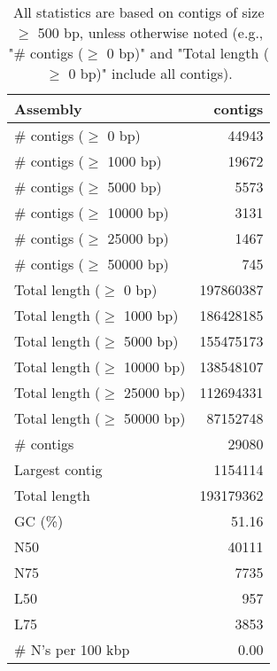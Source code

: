 \documentclass[12pt,a4paper]{article}
\begin{document}
\begin{table}[ht]
\begin{center}
\caption{All statistics are based on contigs of size $\geq$ 500 bp, unless otherwise noted (e.g., "\# contigs ($\geq$ 0 bp)" and "Total length ($\geq$ 0 bp)" include all contigs).}
\begin{tabular}{|l*{1}{|r}|}
\hline
Assembly & contigs \\ \hline
\# contigs ($\geq$ 0 bp) & 44943 \\ \hline
\# contigs ($\geq$ 1000 bp) & 19672 \\ \hline
\# contigs ($\geq$ 5000 bp) & 5573 \\ \hline
\# contigs ($\geq$ 10000 bp) & 3131 \\ \hline
\# contigs ($\geq$ 25000 bp) & 1467 \\ \hline
\# contigs ($\geq$ 50000 bp) & 745 \\ \hline
Total length ($\geq$ 0 bp) & 197860387 \\ \hline
Total length ($\geq$ 1000 bp) & 186428185 \\ \hline
Total length ($\geq$ 5000 bp) & 155475173 \\ \hline
Total length ($\geq$ 10000 bp) & 138548107 \\ \hline
Total length ($\geq$ 25000 bp) & 112694331 \\ \hline
Total length ($\geq$ 50000 bp) & 87152748 \\ \hline
\# contigs & 29080 \\ \hline
Largest contig & 1154114 \\ \hline
Total length & 193179362 \\ \hline
GC (\%) & 51.16 \\ \hline
N50 & 40111 \\ \hline
N75 & 7735 \\ \hline
L50 & 957 \\ \hline
L75 & 3853 \\ \hline
\# N's per 100 kbp & 0.00 \\ \hline
\end{tabular}
\end{center}
\end{table}
\end{document}
